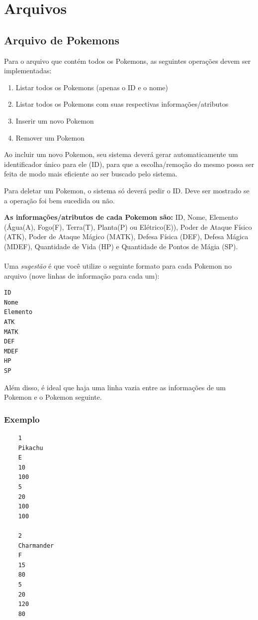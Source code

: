 \documentclass[12pt]{article}
\begin{document}
\section{Arquivos}
\subsection{Arquivo de Pokemons}
Para o arquivo que contém todos os Pokemons, as seguintes operações devem ser implementadas:

\begin{enumerate}
  \item Listar todos os Pokemons (apenas o ID e o nome)
  \item Listar todos os Pokemons com suas respectivas informações/atributos
  \item Inserir um novo Pokemon
  \item Remover um Pokemon
\end{enumerate}

Ao incluir um novo Pokemon, seu sistema deverá gerar automaticamente um identificador único para ele (ID), para que a escolha/remoção do mesmo possa ser feita de modo mais eficiente ao ser buscado pelo sistema.

Para deletar um Pokemon, o sistema só deverá pedir o ID. Deve ser mostrado se a operação foi bem sucedida ou não.

\textbf{As informações/atributos de cada Pokemon são:} ID, Nome, Elemento (Água(A), Fogo(F), Terra(T), Planta(P) ou Elétrico(E)), Poder de Ataque Físico (ATK), Poder de Ataque Mágico (MATK), Defesa Física (DEF), Defesa Mágica (MDEF), Quantidade de Vida (HP) e Quantidade de Pontos de Mágia (SP).\\\\

Uma {\it sugestão} é que você utilize o seguinte formato para cada Pokemon no arquivo (nove linhas de informação para cada um):

\begin{verbatim}
ID
Nome
Elemento
ATK
MATK
DEF
MDEF
HP
SP
\end{verbatim}

Além disso, é ideal que haja uma linha vazia entre as informações de um Pokemon e o Pokemon seguinte.

\subsubsection{Exemplo}
\begin{verbatim}
	1
	Pikachu
	E
	10
	100
	5
	20
	100
	100
	
	2
	Charmander
	F
	15
	80
	5
	20
	120
	80
\end{verbatim}
\end{document}
